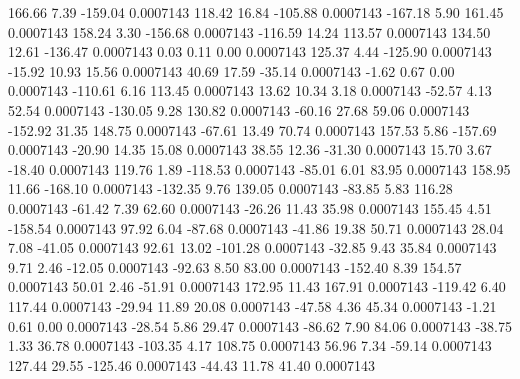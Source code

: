       166.66        7.39     -159.04     0.0007143
      118.42       16.84     -105.88     0.0007143
     -167.18        5.90      161.45     0.0007143
      158.24        3.30     -156.68     0.0007143
     -116.59       14.24      113.57     0.0007143
      134.50       12.61     -136.47     0.0007143
        0.03        0.11        0.00     0.0007143
      125.37        4.44     -125.90     0.0007143
      -15.92       10.93       15.56     0.0007143
       40.69       17.59      -35.14     0.0007143
       -1.62        0.67        0.00     0.0007143
     -110.61        6.16      113.45     0.0007143
       13.62       10.34        3.18     0.0007143
      -52.57        4.13       52.54     0.0007143
     -130.05        9.28      130.82     0.0007143
      -60.16       27.68       59.06     0.0007143
     -152.92       31.35      148.75     0.0007143
      -67.61       13.49       70.74     0.0007143
      157.53        5.86     -157.69     0.0007143
      -20.90       14.35       15.08     0.0007143
       38.55       12.36      -31.30     0.0007143
       15.70        3.67      -18.40     0.0007143
      119.76        1.89     -118.53     0.0007143
      -85.01        6.01       83.95     0.0007143
      158.95       11.66     -168.10     0.0007143
     -132.35        9.76      139.05     0.0007143
      -83.85        5.83      116.28     0.0007143
      -61.42        7.39       62.60     0.0007143
      -26.26       11.43       35.98     0.0007143
      155.45        4.51     -158.54     0.0007143
       97.92        6.04      -87.68     0.0007143
      -41.86       19.38       50.71     0.0007143
       28.04        7.08      -41.05     0.0007143
       92.61       13.02     -101.28     0.0007143
      -32.85        9.43       35.84     0.0007143
        9.71        2.46      -12.05     0.0007143
      -92.63        8.50       83.00     0.0007143
     -152.40        8.39      154.57     0.0007143
       50.01        2.46      -51.91     0.0007143
      172.95       11.43      167.91     0.0007143
     -119.42        6.40      117.44     0.0007143
      -29.94       11.89       20.08     0.0007143
      -47.58        4.36       45.34     0.0007143
       -1.21        0.61        0.00     0.0007143
      -28.54        5.86       29.47     0.0007143
      -86.62        7.90       84.06     0.0007143
      -38.75        1.33       36.78     0.0007143
     -103.35        4.17      108.75     0.0007143
       56.96        7.34      -59.14     0.0007143
      127.44       29.55     -125.46     0.0007143
      -44.43       11.78       41.40     0.0007143
